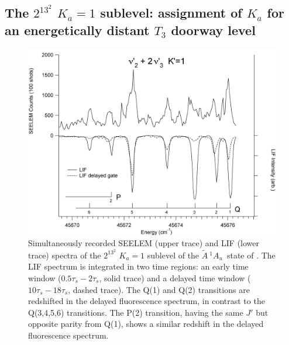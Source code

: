 \documentclass[12pt]{mitthesis}
\newcommand{\astate}{$
  \tilde{A} \: ^1\!A_u
  $}
\newcommand{\Ka}[1]{$K_a\!\!=\!#1$}
\begin{document}
\subsection{The $2^13^2$ \Ka{1} sublevel: assignment of $K_a$ for an
  energetically distant $T_3$ doorway level}



\begin{figure}
  \caption{Simultaneously recorded SEELEM (upper trace) and LIF (lower
    trace) spectra of the $2^13^2$ \Ka{1} sublevel of the \astate\
    state of .  The LIF spectrum is integrated in two time
    regions: an early time window ($0.5\tau_s-2\tau_s$, solid trace)
    and a delayed time window ($10\tau_s-18\tau_s$, dashed trace).
    The Q(1) and Q(2) transitions are redshifted in the delayed
    fluorescence spectrum, in contrast to the Q(3,4,5,6) transitions.
    The P(2) transition, having the same $J'$ but opposite parity from
    Q(1), shows a similar redshift in the delayed fluorescence
    spectrum.}
  \label{fig:spectrum-2132}
  \centering
  \vspace{1cm}
  \includegraphics[width=7in,angle=90]{acetylene-2132-q6q1.png}
\end{figure}
\end{document}

